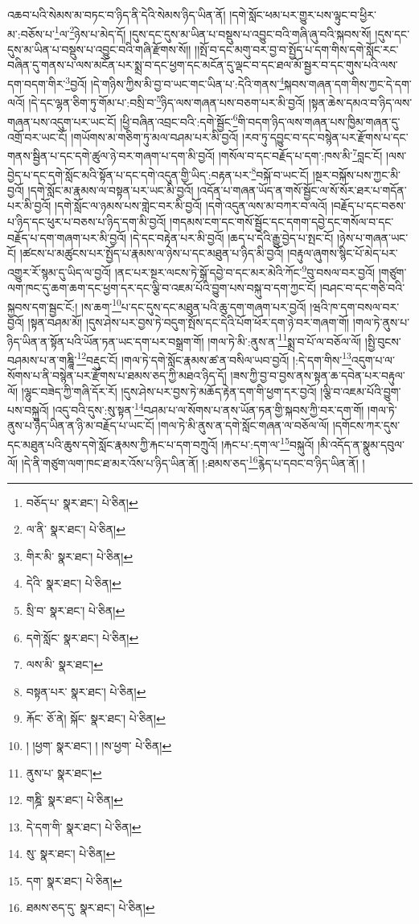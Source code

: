 འཆབ་པའི་སེམས་མ་བཏང་བ་ཉིད་ནི་དེའི་སེམས་ཉིད་ཡིན་ནོ། །དགེ་སློང་ཕམ་པར་གྱུར་པས་ལྟུང་བ་ཕྱིར་མ་:བཅོས་པ་\footnote{བཅོད་པ་  སྣར་ཐང་།  པེ་ཅིན། }ལ་\footnote{ལ་ནི་  སྣར་ཐང་།  པེ་ཅིན། }ཉེས་པ་མེད་དོ། །དུས་དང་དུས་མ་ཡིན་པ་བསྡུས་པ་འབྱུང་བའི་གཞི་ཞུ་བའི་སྐབས་སོ། །དུས་དང་དུས་མ་ཡིན་པ་བསྡུས་པ་འབྱུང་བའི་གཞི་རྫོགས་སོ།། །།སྤོ་བ་དང་མགུ་བར་བྱ་བ་སྤྱོད་པ་དག་གིས་དགེ་སློང་རང་བཞིན་དུ་གནས་པ་ལས་མངོན་པར་སྨྲ་བ་དང་ཕྱག་དང་མངོན་དུ་ལྡང་བ་དང་ཐལ་མོ་སྦྱར་བ་དང་གུས་པའི་ལས་དག་བདག་གིར་\footnote{གིར་མི་  སྣར་ཐང་།  པེ་ཅིན། }བྱའོ། །དེ་གཉིས་ཀྱིས་མི་བྱ་བ་ཡང་གང་ཡིན་པ་:དེའི་གནས་\footnote{དེའི་  སྣར་ཐང་།  པེ་ཅིན། }སྐབས་གཞན་དག་གིས་ཀྱང་དེ་དག་ལའོ། །དེ་དང་ལྷན་ཅིག་ཏུ་གོམ་པ་:བསྲི་བ་\footnote{སྲི་བ་  སྣར་ཐང་།  པེ་ཅིན། }ཉིད་ལས་གཞན་པས་བཅག་པར་མི་བྱའོ། །སྟན་ཆེས་དམའ་བ་ཉིད་ལས་གཞན་པས་འདུག་པར་ཡང་ངོ། །ཕྱི་བཞིན་འབྲང་བའི་:དགེ་སྦྱོང་\footnote{དགེ་སློང་  སྣར་ཐང་།  པེ་ཅིན། }གི་བདག་ཉིད་ལས་གཞན་པས་ཁྱིམ་གཞན་དུ་འགྲོ་བར་ཡང་ངོ། །གཡོགས་མ་གཅིག་ཏུ་མལ་བཤམ་པར་མི་བྱའོ། །རབ་ཏུ་དབྱུང་བ་དང་བསྙེན་པར་རྫོགས་པ་དང་གནས་སྦྱིན་པ་དང་དགེ་ཚུལ་ཉེ་བར་གཞག་པ་དག་མི་བྱའོ། །གསོལ་བ་དང་བརྗོད་པ་དག་:ཁས་མི་\footnote{ལས་མི་  སྣར་ཐང་། }བླང་ངོ། །ལས་བྱེད་པ་དང་དགེ་སློང་མའི་སྟོན་པ་དང་དགེ་འདུན་གྱི་ཡིད་:བརྟན་པར་\footnote{བསྟན་པར་  སྣར་ཐང་།  པེ་ཅིན། }བསྐོ་བ་ཡང་ངོ། །སྔར་བསྐོས་པས་ཀྱང་མི་བྱའོ། །དགེ་སློང་མ་རྣམས་ལ་བསྟན་པར་ཡང་མི་བྱའོ། །འདོན་པ་གཞན་ཡོད་ན་གསོ་སྦྱོང་ལ་སོ་སོར་ཐར་པ་གདོན་པར་མི་བྱའོ། །དགེ་སློང་ལ་ཉམས་པས་གླེང་བར་མི་བྱའོ། །དགེ་འདུན་ལས་མ་བཀར་བ་ལའོ། །བརྗོད་པ་དང་བཅས་པ་ཉིད་དང་ཕུར་པ་བཅས་པ་ཉིད་དག་མི་བྱའོ། །གདམས་ངག་དང་གསོ་སྦྱོང་དང་དགག་དབྱེ་དང་གསོལ་བ་དང་བརྗོད་པ་དག་གཞག་པར་མི་བྱའོ། །དེ་དང་བརྟེན་པར་མི་བྱའོ། །ཆད་པ་དེའི་རྒྱུ་བྱེད་པ་སྤང་ངོ། །ཉེས་པ་གཞན་ཡང་ངོ། །ཚངས་པ་མཚུངས་པར་སྤྱོད་པ་རྣམས་ལ་ཉེས་པ་དང་མཐུན་པ་ཉིད་མི་བྱའོ། །བརྟུལ་ཞུགས་སྙིང་པོ་མེད་པར་འགྱུར་རོ་སྙམ་དུ་ཡིད་ལ་བྱའོ། །ནང་པར་སྔར་ལངས་ཏེ་སྒོ་དབྱེ་བ་དང་མར་མེའི་ཀོང་\footnote{རྐོང་  ཅོ་ནེ། སྐོང་  སྣར་ཐང་།  པེ་ཅིན། }བུ་བསལ་བར་བྱའོ། །གཙུག་ལག་ཁང་དུ་ཆག་ཆག་དང་ཕྱག་དར་དང་ལྕི་བ་འཇམ་པོའི་བྱུག་པས་བསྐུ་བ་དག་ཀྱང་ངོ། །བཤང་བ་དང་གཅི་བའི་སྐྱབས་དག་སྦྱང་ངོ:། །ས་ཆག་\footnote{། །ཕྱག་  སྣར་ཐང་། ། །ས་ཕྱག་  པེ་ཅིན། }པ་དང་དུས་དང་མཐུན་པའི་ཆུ་དག་གཞག་པར་བྱའོ། །ཝའི་ཁ་དག་བསལ་བར་བྱའོ། །སྟན་བཤམ་མོ། །དུས་ཤེས་པར་བྱས་ཏེ་བདུག་སྤོས་དང་དེའི་པོག་ཕོར་དག་ཉེ་བར་གཞག་གོ། །གལ་ཏེ་ནུས་པ་ཉིད་ཡིན་ན་སྟོན་པའི་ཡོན་ཏན་ཡང་དག་པར་བསྒྲག་གོ། །གལ་ཏེ་མི་:ནུས་ན་\footnote{ནུས་པ་  སྣར་ཐང་། }སྨྲ་བ་པོ་ལ་བཅོལ་ལོ། །སྤྱི་བུངས་བཤམས་པ་ན་གཎྜཱི་\footnote{གཎྜི་  སྣར་ཐང་།  པེ་ཅིན། }བརྡུང་ངོ། །གལ་ཏེ་དགེ་སློང་རྣམས་ཚ་ན་བསིལ་ཡབ་བྱའོ། །:དེ་དག་གིས་\footnote{དེ་དག་གི་  སྣར་ཐང་།  པེ་ཅིན། }འདུག་པ་ལ་སོགས་པ་ནི་བསྙེན་པར་རྫོགས་པ་ཐམས་ཅད་ཀྱི་མཐའ་ཉིད་དོ། །ཟས་ཀྱི་བྱ་བ་བྱས་ནས་སྟན་ཆ་དབེན་པར་བརྟུལ་ལོ། །ལྷུང་བཟེད་ཀྱི་གཞི་དོར་རོ། །དུས་ཤེས་པར་བྱས་ཏེ་མཆོད་རྟེན་དག་གི་ཕྱག་དར་བྱའོ། །ལྕི་བ་འཇམ་པོའི་བྱུག་པས་བསྐུའོ། །འདུ་བའི་དུས་:སུ་སྟན་\footnote{སུ་  སྣར་ཐང་།  པེ་ཅིན། }བཤམ་པ་ལ་སོགས་པ་ནས་ཡོན་ཏན་གྱི་སྐབས་ཀྱི་བར་དག་གོ། །གལ་ཏེ་ནུས་པ་ཉིད་ཡིན་ན་ཉི་མ་བརྗོད་པ་ཡང་ངོ། །གལ་ཏེ་མི་ནུས་ན་དགེ་སློང་གཞན་ལ་བཅོལ་ལོ། །དགོངས་ཀར་དུས་དང་མཐུན་པའི་ཆུས་དགེ་སློང་རྣམས་ཀྱི་རྐང་པ་དག་བཀྲུའོ། །རྐང་པ་:དག་ལ་\footnote{དག་  སྣར་ཐང་།  པེ་ཅིན། }བསྐུའོ། །མི་འདོད་ན་སྣུམ་དབུལ་ལོ། །དེ་ནི་གཙུག་ལག་ཁང་ཐ་མར་འོས་པ་ཉིད་ཡིན་ནོ། །:ཐམས་ཅད་\footnote{ཐམས་ཅད་དུ་  སྣར་ཐང་།  པེ་ཅིན། }རྙེད་པ་དབང་བ་ཉིད་ཡིན་ནོ། །
